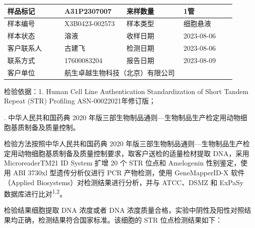 \documentclass[UTF8,10pt,a4paper,fontset=fandol]{ctexart}
\newcommand{\fieldvalue}[1]{#1}
\begin{document}
\noindent
\begin{tabular}{|p{0.23\linewidth}|p{0.25\linewidth}|p{0.23\linewidth}|p{0.21\linewidth}|}
\hline
样品标记 &
\fieldvalue{A31P2307007}
&
来样数量 &
\fieldvalue{1管}
\\ \hline
样本编号 &
\fieldvalue{X3B0423-002573}
&
样本类型 &
\fieldvalue{细胞悬液}
\\ \hline
样本状态 &
\fieldvalue{溶液}
&
收样日期 &
\fieldvalue{2023-08-06}
\\ \hline
客户联系人 &
\fieldvalue{古建飞}
&
检测日期 &
\fieldvalue{2023-08-06}
\\ \hline
联系方式 &
\fieldvalue{17600083204}
&
报告日期 &
\fieldvalue{2023-08-09}
\\ \hline
\multicolumn{1}{|p{0.23\linewidth}|}{客户单位}
&
\multicolumn{3}{p{0.69\linewidth}|}{
\fieldvalue{航生卓越生物科技（北京）有限公司}
}
\\ \hline
\end{tabular}

\vspace{0.8em}

\noindent
检验依据：1. Human Cell Line Authentication Standardization of Short Tandem Repeat (STR) Profiling ASN-0002\quad 2021年修订版；

. 中华人民共和国药典 2020 年版三部生物制品通则---生物制品生产检定用动物细胞基质制备及质量控制。

\medskip

\noindent
检验方法按照中华人民共和国药典 2020 年版三部生物制品通则---生物制品生产检定用动物细胞基质制备及质量控制要求，取客户送检的适量检材提取 DNA，采用 MicroreaderTM21 ID System 扩增 20 个 STR 位点和 Amelogenin 性别鉴定，使用 ABI 3730xl 型遗传分析仪进行 PCR 产物检测，使用 GeneMapperID-X 软件（Applied Biosystems）对检测结果进行分析，并与 ATCC、DSMZ 和 ExPaSy 数据库进行比对\textsuperscript{1,2}。

\noindent
检验结果细胞提取 DNA 浓度或者 DNA 浓度质量合格，实验中阴性及阳性对照结果均正确，检测结果符合国家标准。该细胞的 STR 位点检测结果如下：
\end{document}

